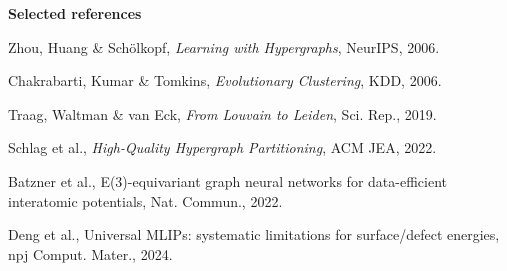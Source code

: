 \documentclass[10pt,twocolumn]{article}
\begin{document}
\vspace{3pt}
{\sffamily\bfseries\fontsize{8.1}{9.2}\selectfont\color{navy} Selected references}\par
{\fontsize{7.5}{8.5}\selectfont
[1] Zhou, Huang \& Sch\"olkopf, \emph{Learning with Hypergraphs}, NeurIPS, 2006.\par
[2] Chakrabarti, Kumar \& Tomkins, \emph{Evolutionary Clustering}, KDD, 2006.\par
[3] Traag, Waltman \& van Eck, \emph{From Louvain to Leiden}, Sci. Rep., 2019.\par
[4] Schlag et al., \emph{High-Quality Hypergraph Partitioning}, ACM JEA, 2022.\par
[5] Batzner et al., E(3)-equivariant graph neural networks for data-efficient interatomic potentials, Nat. Commun., 2022.\par
[6] Deng et al., Universal MLIPs: systematic limitations for surface/defect energies, npj Comput. Mater., 2024.\par
}
\end{document}
